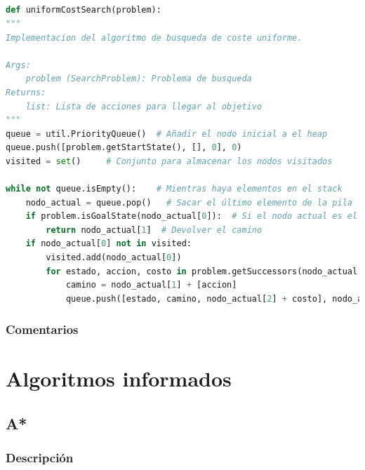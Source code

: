 \documentclass{report}
\begin{document}
          \paragraph*{}{
            \begin{lstlisting}[language=Python, caption=Implementación final del UCS]
def uniformCostSearch(problem):
"""
Implementacion del algoritmo de busqueda de coste uniforme.

Args:
    problem (SearchProblem): Problema de busqueda
Returns:
    list: Lista de acciones para llegar al objetivo
"""
queue = util.PriorityQueue()  # Añadir el nodo inicial a el heap
queue.push([problem.getStartState(), [], 0], 0)
visited = set()     # Conjunto para almacenar los nodos visitados

while not queue.isEmpty():    # Mientras haya elementos en el stack
    nodo_actual = queue.pop()   # Sacar el último elemento de la pila
    if problem.isGoalState(nodo_actual[0]):  # Si el nodo actual es el objetivo
        return nodo_actual[1]  # Devolver el camino
    if nodo_actual[0] not in visited:
        visited.add(nodo_actual[0])
        for estado, accion, costo in problem.getSuccessors(nodo_actual[0]): # Añadir los hijos del nodo actual a la pila
            camino = nodo_actual[1] + [accion]
            queue.push([estado, camino, nodo_actual[2] + costo], nodo_actual[2] + costo)
            \end{lstlisting}
          }
        \subsection*{Comentarios}
          \paragraph*{}{

          }
    \chapter{Algoritmos informados}
      \section{A*}
        \subsection*{Descripción}
          \paragraph*{}{

          }
\end{document}
